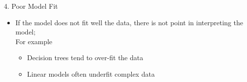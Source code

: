 \documentclass[aspectratio=169]{../latex_main/tntbeamer}  %
\begin{document}
    \begin{frame}[c]{4. Poor Model Fit}
    
        \begin{itemize}
            \item If the model does not fit well the data, there is not point in interpreting the model;\\
            For example
            \begin{itemize}
                \item Decision trees tend to over-fit the data
                \item Linear models often underfit complex data
            \end{itemize}
        \end{itemize}
    
    \end{frame}

	
\end{document}
